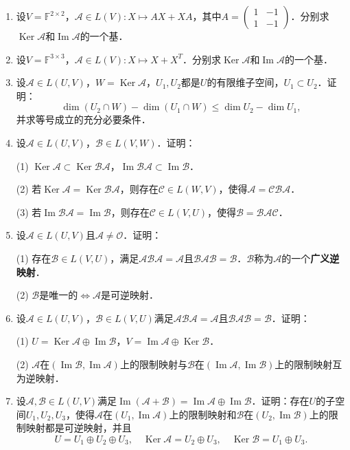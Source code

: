 \documentclass[a4paper,fontset=windows]{ctexbook}
\theoremstyle{definition}
\DeclareMathOperator{\im}{Im}
\DeclareMathOperator{\Ker}{Ker}
\renewcommand{\le}{\leqslant}
\begin{document}
\begin{enumerate}
\item 设$V=\mathbb{F}^{2\times 2}$，$\mathcal{A}\in L(V):X\mapsto AX+XA$，其中$A=\begin{pmatrix}1&-1 \\ 1&-1\end{pmatrix}$．分别求$\Ker\mathcal{A}$和$\im\mathcal{A}$的一个基．

\item 设$V=\mathbb{F}^{3\times 3}$，$\mathcal{A}\in L(V):X\mapsto X+X^T$．分别求$\Ker\mathcal{A}$和$\im\mathcal{A}$的一个基．

\item 设$\mathcal{A}\in L(U,V)$，$W=\Ker\mathcal{A}$，$U_1,U_2$都是$U$的有限维子空间，$U_1\subset U_2$．证明：
$$\dim(U_2\cap W)-\dim(U_1\cap W)\le\dim U_2-\dim U_1,$$
并求等号成立的充分必要条件．

\item 设$\mathcal{A}\in L(U,V)$，$\mathcal{B}\in L(V,W)$．证明：

(1) $\Ker\mathcal{A}\subset\Ker\mathcal{BA}$，$\im\mathcal{BA}\subset\im\mathcal{B}$．

(2) 若$\Ker\mathcal{A}=\Ker\mathcal{BA}$，则存在$\mathcal{C}\in L(W,V)$，使得$\mathcal{A=CBA}$．

(3) 若$\im\mathcal{BA}=\im\mathcal{B}$，则存在$\mathcal{C}\in L(V,U)$，使得$\mathcal{B=BAC}$．

\item 设$\mathcal{A}\in L(U,V)$且$\mathcal{A\ne O}$．证明：

(1) 存在$\mathcal{B}\in L(V,U)$，满足$\mathcal{ABA=A}$且$\mathcal{BAB=B}$．$\mathcal{B}$称为$\mathcal{A}$的一个{\bf 广义逆映射}．

(2) $\mathcal{B}$是唯一的$\Leftrightarrow\mathcal{A}$是可逆映射．

\item 设$\mathcal{A}\in L(U,V)$，$\mathcal{B}\in L(V,U)$满足$\mathcal{ABA=A}$且$\mathcal{BAB=B}$．证明：

(1) $U=\Ker\mathcal{A}\oplus\im\mathcal{B}$，$V=\im\mathcal{A}\oplus\Ker\mathcal{B}$．

(2) $\mathcal{A}$在$(\im\mathcal{B},\im\mathcal{A})$上的限制映射与$\mathcal{B}$在$(\im\mathcal{A},\im\mathcal{B})$上的限制映射互为逆映射．

\item 设$\mathcal{A,B}\in L(U,V)$满足$\im(\mathcal{A+B})=\im\mathcal{A}\oplus\im\mathcal{B}$．证明：存在$U$的子空间$U_1,U_2,U_3$，使得$\mathcal{A}$在$(U_1,\im\mathcal{A})$上的限制映射和$\mathcal{B}$在$(U_2,\im\mathcal{B})$上的限制映射都是可逆映射，并且
$$U=U_1\oplus U_2\oplus U_3,\quad\Ker\mathcal{A}=U_2\oplus U_3,\quad\Ker\mathcal{B}=U_1\oplus U_3.$$


\end{enumerate}
\end{document}
